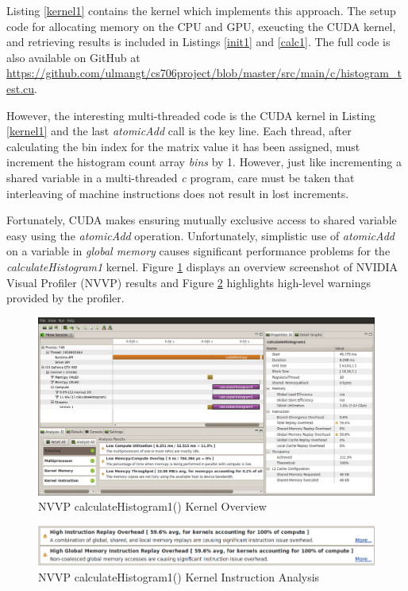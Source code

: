 \documentclass{article}
\begin{document}
Listing \ref{kernel1} contains the kernel which implements this approach. The setup code for allocating memory on the CPU and GPU, exeucting the CUDA kernel, and retrieving results is included in Listings \ref{init1} and \ref{calc1}. The full code is also available on GitHub at \url{https://github.com/ulmangt/cs706project/blob/master/src/main/c/histogram_test.cu}.

However, the interesting multi-threaded code is the CUDA kernel in Listing \ref{kernel1} and the last \emph{atomicAdd} call is the key line. Each thread, after calculating the bin index for the matrix value it has been assigned, must increment the histogram count array \emph{bins} by 1. However, just like incrementing a shared variable in a multi-threaded \emph{c} program, care must be taken that interleaving of machine instructions does not result in lost increments.

Fortunately, CUDA makes ensuring mutually exclusive access to shared variable easy using the \emph{atomicAdd} operation\cite{arithmetic-functions}. Unfortunately, simplistic use of \emph{atomicAdd} on a variable in \emph{global memory} causes significant performance problems for the \emph{calculateHistogram1} kernel. Figure \ref{kernel1nvvp1} displays an overview screenshot of NVIDIA Visual Profiler (NVVP) results and Figure \ref{kernel1nvvp2} highlights high-level warnings provided by the profiler.

\begin{figure}
\centering
\includegraphics[width=1.0\textwidth]{screenshots/nvvp/calculateHistogram1_screen1.png}
\caption{NVVP calculateHistogram1() Kernel Overview }
\label{kernel1nvvp1}
\end{figure}

\begin{figure}
\centering
\includegraphics[width=1.0\textwidth]{screenshots/nvvp/calculateHistogram1_screen2.png}
\caption{NVVP calculateHistogram1() Kernel Instruction Analysis}
\label{kernel1nvvp2}
\end{figure}
\end{document}
